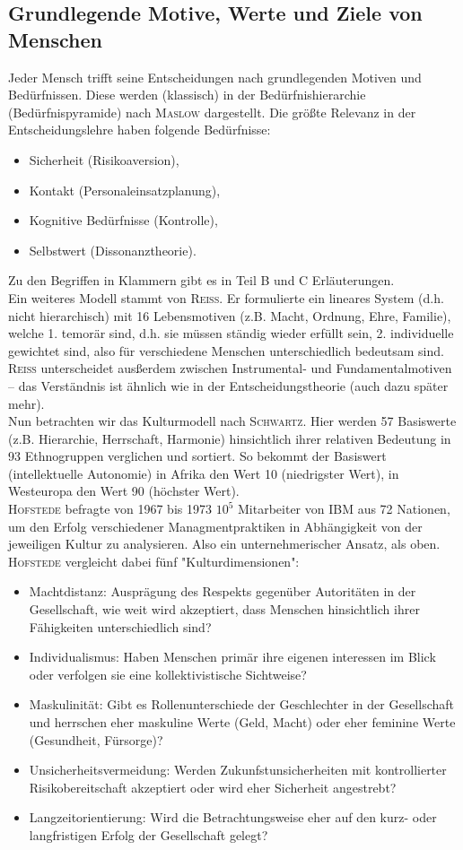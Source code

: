 \subsection{Grundlegende Motive, Werte und Ziele von Menschen}
Jeder Mensch trifft seine Entscheidungen nach grundlegenden Motiven und Bedürfnissen. Diese werden (klassisch) in der Bedürfnishierarchie (Bedürfnispyramide) nach \textsc{Maslow} dargestellt. Die größte Relevanz in der Entscheidungslehre haben folgende Bedürfnisse:
\begin{itemize}
	\item Sicherheit (Risikoaversion),
	\item Kontakt (Personaleinsatzplanung),
	\item Kognitive Bedürfnisse (Kontrolle),
	\item Selbstwert (Dissonanztheorie).
\end{itemize}
Zu den Begriffen in Klammern gibt es in Teil B und C Erläuterungen.\\
Ein weiteres Modell stammt von \textsc{Reiss}. Er formulierte ein lineares System (d.h. nicht hierarchisch) mit 16 Lebensmotiven (z.B. Macht, Ordnung, Ehre, Familie), welche 1. temorär sind, d.h. sie müssen ständig wieder erfüllt sein, 2. individuelle gewichtet sind, also für verschiedene Menschen unterschiedlich bedeutsam sind. \textsc{Reiss} unterscheidet ausßerdem zwischen Instrumental- und Fundamentalmotiven -- das Verständnis ist ähnlich wie in der Entscheidungstheorie (auch dazu später mehr).\\
Nun betrachten wir das Kulturmodell nach \textsc{Schwartz}. Hier werden 57 Basiswerte (z.B. Hierarchie, Herrschaft, Harmonie) hinsichtlich ihrer relativen Bedeutung in 93 Ethnogruppen verglichen und sortiert. So bekommt der Basiswert (intellektuelle Autonomie) in Afrika den Wert 10 (niedrigster Wert), in Westeuropa den Wert 90 (höchster Wert).\\
\textsc{Hofstede} befragte von 1967 bis 1973 \(10^5\) Mitarbeiter von IBM aus 72 Nationen, um den Erfolg verschiedener Managmentpraktiken in Abhängigkeit von der jeweiligen Kultur zu analysieren. Also ein unternehmerischer Ansatz, als oben. \textsc{Hofstede} vergleicht dabei fünf "Kulturdimensionen":
\begin{itemize}
	\item Machtdistanz: Ausprägung des Respekts gegenüber Autoritäten in der Gesellschaft, wie weit wird akzeptiert, dass Menschen hinsichtlich ihrer Fähigkeiten unterschiedlich sind?
	\item Individualismus: Haben Menschen primär ihre eigenen interessen im Blick oder verfolgen sie eine kollektivistische Sichtweise?
	\item Maskulinität: Gibt es Rollenunterschiede der Geschlechter in der Gesellschaft und herrschen eher maskuline Werte (Geld, Macht) oder eher feminine Werte (Gesundheit, Fürsorge)?
	\item Unsicherheitsvermeidung: Werden Zukunfstunsicherheiten mit kontrollierter Risikobereitschaft akzeptiert oder wird eher Sicherheit angestrebt?
	\item Langzeitorientierung: Wird die Betrachtungsweise eher auf den kurz- oder langfristigen Erfolg der Gesellschaft gelegt?
\end{itemize}
